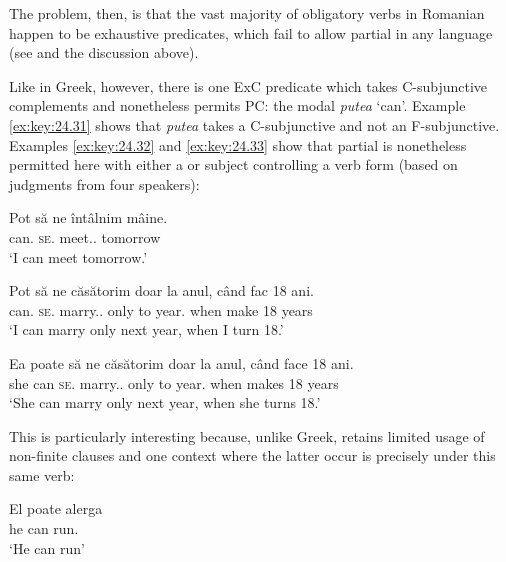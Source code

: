 \documentclass[output=paper]{langsci/langscibook}
\begin{document}
The problem, then, is that the vast majority of obligatory  verbs in
Romanian happen to be exhaustive  predicates, which fail to allow
partial  in any language (see \citealt{Landau2000,Landau2004,Landau2015}
and the discussion above).

Like in Greek, however, there is one \gls{ExC}
predicate which takes C-subjunctive complements and nonetheless permits PC: the
modal \emph{putea} ‘can’. Example \eqref{ex:key:24.31} shows that \emph{putea} takes a
C-subjunctive and not an F-subjunctive. Examples \eqref{ex:key:24.32} and \eqref{ex:key:24.33} show that
partial  is nonetheless permitted here with either a \Fsg{} or \Tsg{}
subject controlling a \Fpl{} verb form (based on judgments from four speakers):

\ea%
    \label{ex:key:24.31} 
\z

\ea%
    \label{ex:key:24.32} 
    \sn
	\gll Pot   să   ne     întâlnim     mâine.\\
    can.\Fsg{}  \Sbjv{}  \textsc{se}.\Fpl{}  meet.\Sbjv{}.\Fpl{}  tomorrow\\
	\glt ‘I can meet tomorrow.’
\z

\ea%
    \label{ex:key:24.33} 
    \sn
	\gll Pot   să   ne    căsătorim         doar la anul,      când fac      18 ani.\\
    can.\Fsg{}  \Sbjv{}  \textsc{se}.\Fpl{} marry.\Sbjv{}.\Fpl{} only to year.\Def{} when make 18 years\\
	\glt ‘I can marry only next year, when I turn 18.’\newpage
\z

\ea%
    \label{ex:key:24.34} 
    \sn
	\gll Ea  poate   să   ne   căsătorim         doar la anul,      când face   18 ani.\\
    she can   \Sbjv{}   \textsc{se}.\Fpl{} marry.\Sbjv{}.\Fpl{} only  to year.\Def{}      when makes   18 years\\
	\glt ‘She can marry only next year, when she turns 18.’
\z

This is particularly interesting because, unlike Greek,  retains
limited usage of non-finite clauses and one context where the latter occur is
precisely under this same verb:

\ea%
    \label{ex:key:24.35}  \citep[136]{PanaDindelegan2013}
    \sn
	\gll El poate alerga\\
		he can run.\Inf{}\\
	\glt ‘He can run’
\z
\end{document}
